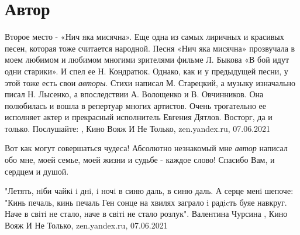  
 
 
 
 
\chapter{Автор}

Второе место - «Нич яка мисячна». Еще одна из самых лиричных и красивых песен,
которая тоже считается народной. Песня «Нич яка мисячна» прозвучала в моем
любимом и любимом многими зрителями фильме Л. Быкова «В бой идут одни старики».
И спел ее Н. Кондратюк. Однако, как и у предыдущей песни, у этой тоже есть свои
\emph{авторы}. Стихи написал М. Старецкий, а музыку изначально писал Н. Лысенко, а
впоследствии А. Волощенко и В. Овчинников.  Она полюбилась и вошла в репертуар
многих артистов. Очень трогательно ее исполняет актер и прекрасный исполнитель
Евгения Дятлов. Восторг, да и только. Послушайте:
, 
Кино Вояж И Не Только, zen.yandex.ru, 07.06.2021

Вот как могут совершаться чудеса! Абсолютно незнакомый мне \emph{автор} написал
обо мне, моей семье, моей жизни и судьбе - каждое слово! Спасибо Вам, и сердцем
и душой.

"Летять, нiби чайкi i днi, i ночi
в синю даль, в синю даль.
А серце менi шепоче: "Кинь печаль, кинь печаль
Ген сонце на хвилях заграло
i радicть буяе навкруг.
Наче в свiтi не стало, наче в свiтi не стало розлук".
Валентина Чурсина
, 
Кино Вояж И Не Только, zen.yandex.ru, 07.06.2021
